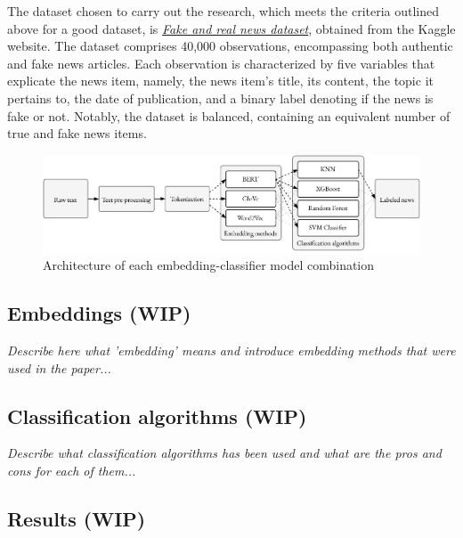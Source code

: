The dataset chosen to carry out the research, which meets the criteria outlined above for a good dataset, is \href{https://www.kaggle.com/datasets/clmentbisaillon/fake-and-real-news-dataset}{\textit{Fake and real news dataset}}, obtained from the Kaggle website. The dataset comprises 40,000 observations, encompassing both authentic and fake news articles. Each observation is characterized by five variables that explicate the news item, namely, the news item's title, its content, the topic it pertains to, the date of publication, and a binary label denoting if the news is fake or not. Notably, the dataset is balanced, containing an equivalent number of true and fake news items.


\begin{figure}
\centering
\includegraphics[width=0.8\linewidth]{methodology-schema_extended.pdf}
\caption{Architecture of each embedding-classifier model combination}
\label{methodology-schema_extended}
\end{figure}


\subsection{Embeddings (WIP)}
\textit{Describe here what 'embedding' means and introduce embedding methods that were used in the paper...}

\subsection{Classification algorithms (WIP)}
\textit{Describe what classification algorithms has been used and what are the pros and cons for each of them...}

\subsection{Results (WIP)}

